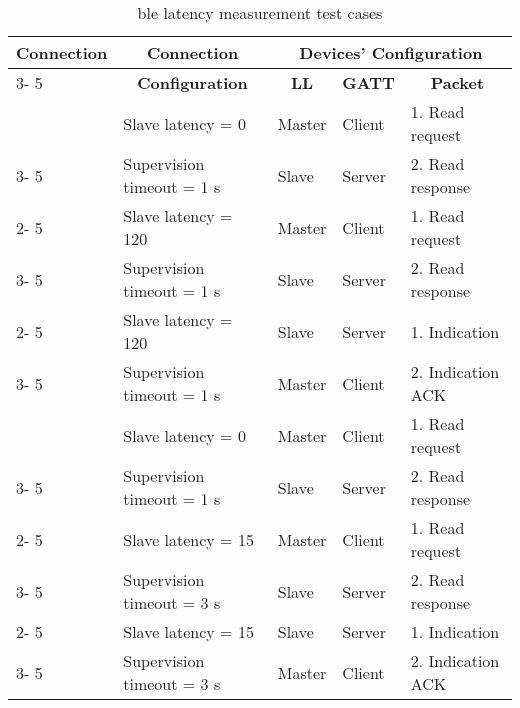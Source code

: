 

\begin{table}[htbp]
\begin{center}
\begin{tabular}{|l|l|l|l|l|}
\hline
\multicolumn{ 1}{|c|}{\textbf{Connection}} & \multicolumn{ 1}{c|}{\textbf{Connection}} & \multicolumn{ 3}{c|}{\textbf{Devices' Configuration}} \\ \cline{ 3- 5}
\multicolumn{ 1}{|c|}{\textbf{Interval}} & \multicolumn{ 1}{c|}{\textbf{Configuration}} & \multicolumn{ 1}{c}{\textbf{LL}} & \multicolumn{ 1}{|c}{\textbf{GATT}} & \multicolumn{ 1}{|c|}{\textbf{Packet}} \\ \hline
\multicolumn{ 1}{|c|}{} & \multicolumn{ 1}{l|}{Slave latency = 0} & Master & Client & 1. Read request \\ \cline{ 3- 5}
\multicolumn{ 1}{|l|}{} & \multicolumn{ 1}{l|}{
Supervision timeout = 1 \si{\second}} & Slave & Server & 2. Read response \\ \cline{ 2- 5}
\multicolumn{ 1}{|c|}{7.5 \si{\milli\second}} & \multicolumn{ 1}{l|}{Slave latency = 120
} & Master & Client & 1. Read request \\ \cline{ 3- 5}
\multicolumn{ 1}{|l|}{} & \multicolumn{ 1}{l|}{Supervision timeout = 1 \si{\second}} & Slave & Server & 2. Read response \\ \cline{ 2- 5}
\multicolumn{ 1}{|l|}{} & \multicolumn{ 1}{l|}{Slave latency = 120
} & Slave & Server & 1. Indication \\ \cline{ 3- 5}
\multicolumn{ 1}{|l|}{} & \multicolumn{ 1}{l|}{Supervision timeout = 1 \si{\second}} & Master & Client & 2. Indication ACK \\ \hline
\multicolumn{ 1}{|c|}{} & \multicolumn{ 1}{l|}{Slave latency = 0
} & Master & Client & 1. Read request \\ \cline{ 3- 5}
\multicolumn{ 1}{|l|}{} & \multicolumn{ 1}{l|}{Supervision timeout = 1 \si{\second}} & Slave & Server & 2. Read response \\ \cline{ 2- 5}
\multicolumn{ 1}{|c|}{125 \si{\milli\second}} & \multicolumn{ 1}{l|}{Slave latency = 15
} & Master & Client & 1. Read request \\ \cline{ 3- 5}
\multicolumn{ 1}{|l|}{} & \multicolumn{ 1}{l|}{Supervision timeout = 3 \si{\second}} & Slave & Server & 2. Read response \\ \cline{ 2- 5}
\multicolumn{ 1}{|l|}{} & \multicolumn{ 1}{l|}{Slave latency = 15
} & Slave & Server & 1. Indication \\ \cline{ 3- 5}
\multicolumn{ 1}{|l|}{} & \multicolumn{ 1}{l|}{Supervision timeout = 3 \si{\second}} & Master & Client & 2. Indication ACK \\ \hline
\end{tabular}
\end{center}
\caption{\gls{ble} latency measurement test cases}
\label{tbl:testcases}
\end{table}

